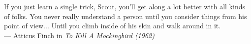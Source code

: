 \thispagestyle{empty}
{}

\vspace*{3cm}

\begin{center}
    If you just learn a single trick, Scout, you'll get along a lot better with all kinds of folks. You never really understand a person until you consider things from his point of view... Until you climb inside of his skin and walk around in it.  \\ \medskip
    --- Atticus Finch in \emph{To Kill A Mockingbird (1962)}   
\end{center}